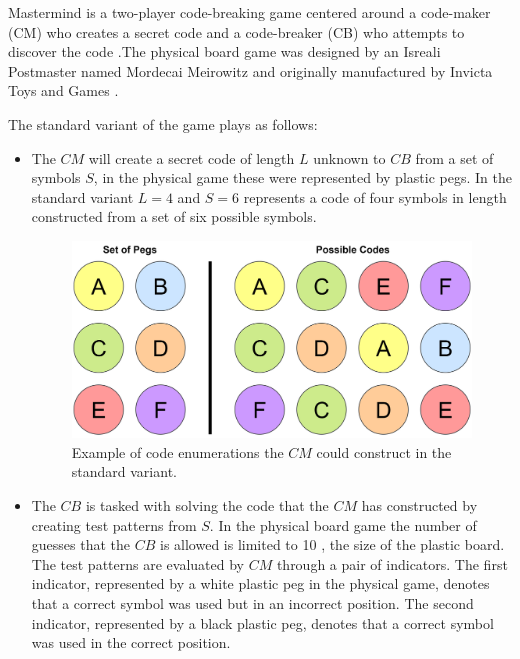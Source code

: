 \documentclass[12pt]{article}  %
\theoremstyle{definition}
\theoremstyle{remark}
\begin{document}
Mastermind is a two-player code-breaking game centered around a code-maker (CM) who creates a secret code and a code-breaker (CB) who attempts to discover the code \cite{Wolfram}.The physical board game was designed by an Isreali Postmaster named Mordecai Meirowitz and originally manufactured by Invicta Toys and Games \cite{Invicta}. 

The standard variant of the game plays as follows:
\begin {itemize}
	\item {The $CM$ will create a secret code of length $L$ unknown to $CB$ from a set of symbols $S$, in the physical game these were represented by plastic pegs. In the standard variant $L=4$ and $S=6$  represents a code of four symbols in length constructed from a set of six possible symbols.}
	\begin{figure}[H]
	\centering
	\includegraphics[scale=0.75]{pegs}
	\caption{ Example of code enumerations the $CM$ could construct in the standard variant.}
	\end{figure}
	\item {The $CB$ is tasked with solving the code that the $CM$ has constructed by creating test patterns from $S$. In the physical board game the number of guesses that the $CB$ is allowed is limited to 10 \cite {Nelson}, the size of the plastic board. The test patterns are evaluated by $CM$ through a pair of indicators. The first indicator, represented by a white plastic peg in the physical game, denotes that a correct symbol was used but in an incorrect position. The second indicator, represented by a black plastic peg, denotes that a correct symbol was used in the correct position.}
	\begin{figure}[H]
	\centering

\end{figure}
\end{itemize}
\end{document}
